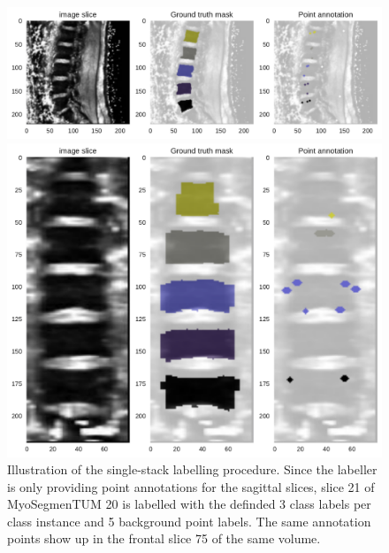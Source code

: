 \begin{figure}
    \centering
    \centering
    \begin{minipage}{.99\textwidth}
        \includegraphics[width=.99\textwidth]{images/MyoSegmenTUM020_s21_points.pdf}
    \end{minipage} 
    \vspace{1 mm}
    \begin{minipage}{.99\textwidth}
        \includegraphics[width=.99\textwidth]{images/MyoSegmenTUM020_s75_front_points.pdf}
    \end{minipage} 
    \vspace{2 mm}
    \caption{Illustration of the single-stack labelling procedure.
    Since the labeller is only providing point annotations for the sagittal slices, slice 21 of MyoSegmenTUM 20 is labelled with the definded 3 class labels per class instance and 5 background point labels.
    The same annotation points show up in the frontal slice 75 of the same volume. 
    \protect}
\end{figure}

